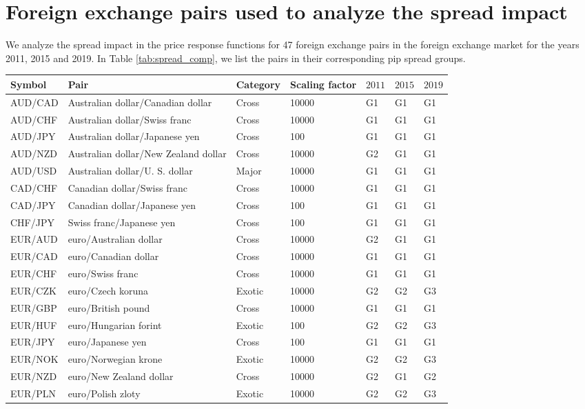 \section{Foreign exchange pairs used to analyze the spread impact}
\label{app:fx_pairs_spread}

We analyze the spread impact in the price response functions for 47 foreign
exchange pairs in the foreign exchange market for the years 2011, 2015 and
2019. In Table \ref{tab:spread_comp}, we list the pairs in their corresponding
pip spread groups.

\begin{table*}
\begin{center}
\begin{centering}
    \begin{threeparttable}
    \caption{Foreign exchange pairs used in Sect. \ref{sec:spread_impact}.}
    \label{tab:spread_comp}
    \begin{tabular}{lllllll}
    \hline
    Symbol & Pair & Category & Scaling factor & $2011$ & $2015$ & $2019$\tabularnewline
    \hline
    AUD/CAD & Australian dollar/Canadian dollar & Cross & 10000 & G1 & G1 & G1\tabularnewline
    AUD/CHF & Australian dollar/Swiss franc & Cross & 10000 & G1 & G1 & G1\tabularnewline
    AUD/JPY & Australian dollar/Japanese yen & Cross & 100 & G1 & G1 & G1\tabularnewline
    AUD/NZD & Australian dollar/New Zealand dollar & Cross & 10000 & G2 & G1 & G1\tabularnewline
    AUD/USD & Australian dollar/U. S. dollar & Major & 10000 & G1 & G1 & G1\tabularnewline
    CAD/CHF & Canadian dollar/Swiss franc & Cross & 10000 & G1 & G1 & G1\tabularnewline
    CAD/JPY & Canadian dollar/Japanese yen & Cross & 100 & G1 & G1 & G1\tabularnewline
    CHF/JPY & Swiss franc/Japanese yen & Cross & 100 & G1 & G1 & G1\tabularnewline
    EUR/AUD & euro/Australian dollar & Cross & 10000 & G2 & G1 & G1\tabularnewline
    EUR/CAD & euro/Canadian dollar & Cross & 10000 & G1 & G1 & G1\tabularnewline
    EUR/CHF & euro/Swiss franc & Cross & 10000 & G1 & G1 & G1\tabularnewline
    EUR/CZK & euro/Czech koruna & Exotic & 10000 & G2 & G2 & G3\tabularnewline
    EUR/GBP & euro/British pound & Cross & 10000 & G1 & G1 & G1\tabularnewline
    EUR/HUF & euro/Hungarian forint & Exotic & 100 & G2 & G2 & G3\tabularnewline
    EUR/JPY & euro/Japanese yen & Cross & 100 & G1 & G1 & G1\tabularnewline
    EUR/NOK & euro/Norwegian krone & Exotic & 10000 & G2 & G2 & G3\tabularnewline
    EUR/NZD & euro/New Zealand dollar & Cross & 10000 & G2 & G1 & G2\tabularnewline
    EUR/PLN & euro/Polish zloty & Exotic & 10000 & G2 & G2 & G3\tabularnewline

\end{tabular}
\end{threeparttable}
\end{centering}
\end{center}
\end{table*}
